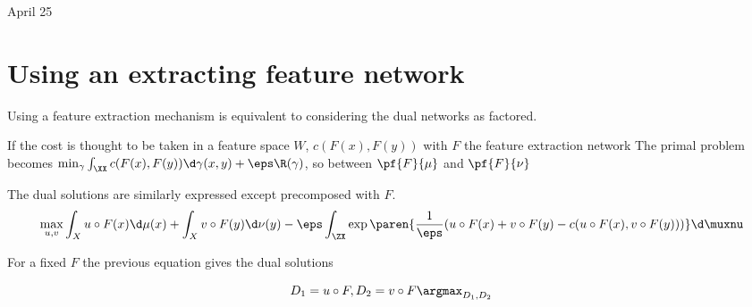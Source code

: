 \documentclass[11pt,a4paper]{article}
\begin{document}

{\Huge April 25}

\section*{Using an extracting feature network}
    Using a feature extraction mechanism is equivalent to considering the dual networks as factored.

    If the cost is thought to be taken in a feature space $W$, $c(F(x),
    F(y))$ with $F$ the feature extraction network
    The primal problem becomes
    $\min_{\gamma}\int_{\XX}c(F(x), F(y)) \d \gamma (x,y) + \eps \R(\gamma)$, so between $\pf{F}{\mu}$ and $\pf{F}{\nu}$

    The dual solutions are similarly expressed except precomposed with $F$.
    \begin{equation}
        \max_{u, v} \int_{X} u \circ F (x) \d \mu(x) + \int_{X} v \circ F(y) \d \nu(y) - \eps \int_{\ZX}{\exp{\paren{ \frac{1}{\eps} ( u \circ F (x) + v \circ F (y)  - c( u \circ F(x), v \circ F(y)))}} \d \muxnu}
    \end{equation}

    For a fixed $F$ the previous equation gives the dual solutions

\begin{equation}
    D_1 = u \circ F, D_2 = v \circ F
    \argmax_{D_1,D_2}
\end{equation}

\printbibliography{}
\end{document}

